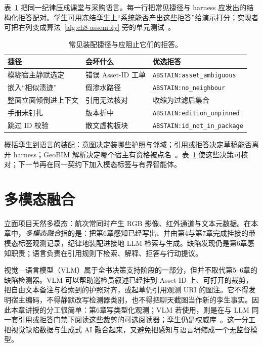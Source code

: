 表~\ref{tab:ch8-assembly-fail} 把同一纪律压成课堂与采购语言。每一行把常见捷径与 harness 应发出的结构化拒答配对。学生可用冻结孪生上``系统能否产出这些拒答''给演示打分；实现者可把右列变成算法~\ref{alg:ch8-assembly} 旁的单元测试~\cite{ji2023,peng2024,liang2023helm}。

\begin{table}[htbp]
\centering
\caption{常见装配捷径与应阻止它们的拒答。}
\label{tab:ch8-assembly-fail}
\begin{tabular}{llp{4.4cm}}
\toprule
捷径 & 会坏什么 & 优选拒答 \\
\midrule
模糊宿主静默选定 & 错误 Asset-ID 工单 & \texttt{ABSTAIN:asset\_ambiguous} \\
嵌入``相似渍迹'' & 假渗水路径 & \texttt{ABSTAIN:no\_neighbour} \\
整面立面倾倒进上下文 & 引用无法核对 & 收缩为过滤后集合 \\
手册未钉扎 & 版本折中 & \texttt{ABSTAIN:edition\_unpinned} \\
跳过 ID 校验 & 散文虚构板块 & \texttt{ABSTAIN:id\_not\_in\_package} \\
\bottomrule
\end{tabular}
\end{table}

概括孪生到语言的装配：意图决定装哪些护照与邻域；引用或拒答决定草稿能否离开 harness；GeoBIM 解析决定哪个宿主有资格被点名~\cite{lewis2020,peng2024,zhang2025}。表~\ref{tab:ch8-assembly-fail} 使这些决策可核对；下一节再在同一契约下加入模态标签与有界智能体。

\section{多模态融合}
\label{sec:ch8-multimodal}

立面项目天然多模态：航次常同时产生 RGB 影像、红外通道与文本元数据。在本章中，\emph{多模态融合}指的是：把第6章感知已经写出、并由第4与第7章完成挂接的带模态标签观测记录，纪律地装配进接地 LLM 检索与生成。缺陷发现仍是第6章感知职责；语言负责在引用规则下检索、解释、拒答与行动提议。

视觉—语言模型（VLM）属于全书决策支持阶段的一部分，但并不取代第5--6章的缺陷检测器。VLM 可以帮助巡检员叙述已经挂到 Asset-ID 上、可打开的裁剪，把自由文本备注与检索到的护照对齐，或起草仍引用观测 URI 的图注。它不得发明宿主编码，不得静默改写检测器类别，也不得把聊天截图当作新的孪生事实。因此本章讲授的分工很简单：第6章写类型化观测；VLM 若使用，则是在与 LLM 同一套引用或拒答门禁下阅读这些裁剪的可选阅读器；孪生仍是权威库~\cite{zhao2024facade,zhao2026physical,ji2023}。这一分工把视觉缺陷数据与生成式 AI 融合起来，又避免把感知与语言坍缩成一个无监督模型。

